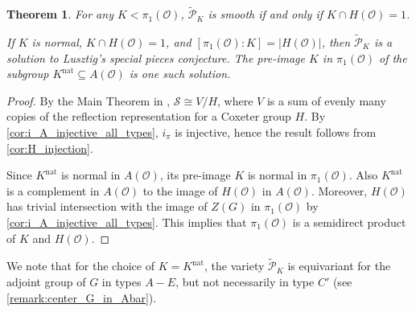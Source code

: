 \documentclass{amsart}
\newtheorem{theorem}{Theorem}[section]
\theoremstyle{definition}
\DeclareMathOperator{\nat}{nat}
\newcommand{\cP}{\mathcal{P}}
\newcommand{\covP}{\widetilde{\mathcal{P}}}
\newcommand{\g}{\mathfrak{g}}
\newcommand{\Ab}{\bar{A}}
\newcommand{\0}{\mathcal{O}}
\begin{document}

\begin{theorem}\label{conceptualthm}
For any $K < \pi_1(\0)$, $\widetilde{\cP}_K$ is smooth if and only if $K \cap H(\0) = 1$. 

If $K$ is normal, $K\cap H(\0)=1$, and $[\pi_1(\0):K] = |H(\0)|$, then $\widetilde{\cP}_K$ is a solution to Lusztig's special pieces conjecture.  
The pre-image $K$  in $\pi_1(\0)$ of the subgroup
$K^{\nat} \subseteq A(\0)$ is one such solution.
\end{theorem}

\begin{proof}
By the Main Theorem in \cite{FJLS23}, ${\mathcal S}\cong V/H$, where $V$ is a sum of evenly many copies of the reflection representation for a Coxeter group $H$.  By \cref{cor:i_A_injective_all_types}, $i_\pi$ is injective, hence the result follows from \cref{cor:H_injection}.  

Since $K^{\nat}$ is normal in $A(\0)$, its pre-image $K$ is normal in $\pi_1(\0)$.  Also $K^{\nat}$ is a complement in $A(\0)$
to the image of $H(\0)$ in $A(\0)$.  Moreover, $H(\0)$ 
has trivial intersection with the image of $Z(G)$ in $\pi_1(\0)$ by \cref{cor:i_A_injective_all_types}.  
This implies that $\pi_1(\0)$ is a semidirect product of $K$ and $H(\0)$.
\end{proof}

We note that for the choice of $K= K^{\nat}$, the variety $\covP_K$ is equivariant for the adjoint group of $G$ in types $A-E$, but not 
necessarily in type $C'$ (see \cref{remark:center_G_in_Abar}).
\end{document}
